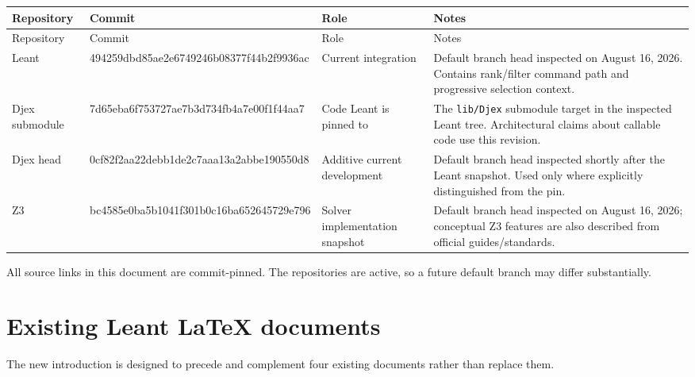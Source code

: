 \documentclass[10pt,letterpaper,oneside]{report}
\newcommand{\filepath}[1]{\nolinkurl{#1}}
\newcommand{\commitid}[1]{{\ttfamily\footnotesize #1}}
\def\LeantCommit{494259dbd85ae2e6749246b08377f44b2f9936ac}
\def\DjexCommit{0cf82f2aa22debb1de2c7aaa13a2abbe190550d8}
\def\DjexPinnedCommit{7d65eba6f753727ae7b3d734fb4a7e00f1f44aa7}
\def\ZthreeCommit{bc4585e0ba5b1041f301b0c16ba652645729e796}
\begin{document}
\begin{longtable}{@{}L{0.13\textwidth}L{0.42\textwidth}L{0.12\textwidth}L{0.25\textwidth}@{}}
\toprule
Repository & Commit & Role & Notes \\
\midrule
\endfirsthead
\toprule
Repository & Commit & Role & Notes \\
\midrule
\endhead
\bottomrule
\endfoot
Leant & \commitid{\LeantCommit} & Current integration & Default branch head inspected on August 16, 2026. Contains rank/filter command path and progressive selection context. \\
Djex submodule & \commitid{\DjexPinnedCommit} & Code Leant is pinned to & The \filepath{lib/Djex} submodule target in the inspected Leant tree. Architectural claims about callable code use this revision. \\
Djex head & \commitid{\DjexCommit} & Additive current development & Default branch head inspected shortly after the Leant snapshot. Used only where explicitly distinguished from the pin. \\
Z3 & \commitid{\ZthreeCommit} & Solver implementation snapshot & Default branch head inspected on August 16, 2026; conceptual Z3 features are also described from official guides/standards. \\
\end{longtable}

All source links in this document are commit-pinned. The repositories are active, so a future default branch may differ substantially.

\section{Existing Leant LaTeX documents}

The new introduction is designed to precede and complement four existing documents rather than replace them.
\end{document}
